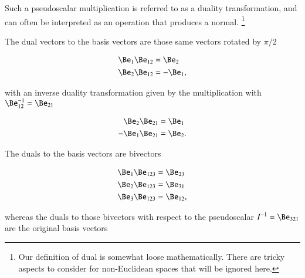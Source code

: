 %
%


Such a pseudoscalar multiplication is referred to as a duality transformation, and can often be interpreted as an operation that produces a normal.
\footnote{Our definition of dual is somewhat loose mathematically.  There are tricky aspects to consider for non-Euclidean spaces that will be ignored here.}

The dual vectors to the  basis vectors are those same vectors rotated by \( \pi/2 \)

\begin{dmath}\label{eqn:dual:360}
\begin{aligned}
\Be_1 \Be_{12} &= \Be_2 \\
\Be_2 \Be_{12} &= -\Be_1,
\end{aligned}
\end{dmath}

with an inverse duality transformation given by the multiplication with \( \Be_{12}^{-1} = \Be_{21} \)

\begin{dmath}\label{eqn:dual:440}
\begin{aligned}
\Be_2 \Be_{21} &= \Be_1 \\
-\Be_1 \Be_{21} &= \Be_2.
\end{aligned}
\end{dmath}

The  duals to the basis vectors are bivectors

\begin{dmath}\label{eqn:dual:380}
\begin{aligned}
\Be_1 \Be_{123} &= \Be_{23} \\
\Be_2 \Be_{123} &= \Be_{31} \\
\Be_3 \Be_{123} &= \Be_{12},
\end{aligned}
\end{dmath}

whereas the duals to those bivectors with respect to the pseudoscalar \( I^{-1} = \Be_{321} \) are the original basis vectors

